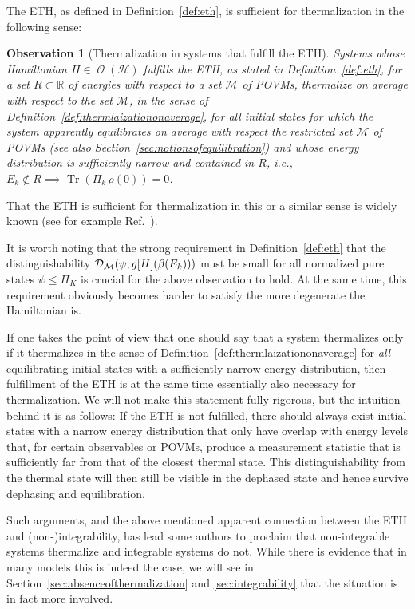 \documentclass[a4paper,12pt,listof=totoc,index=totoc,bibliography=totoc,headsepline=false,headings=normal,BCOR16.153846mm,DIV12,headinclude,twoside,cleardoublepage=empty,numbers=noenddot,final]{scrreprt}
\theoremstyle{mystyle}
\numberwithin{equation}{section}
\numberwithin{figure}{section}
\numberwithin{lemma}{section}
\numberwithin{theorem}{section}
\numberwithin{corollary}{section}
\numberwithin{definition}{section}
\numberwithin{conjecture}{section}
\newtheorem{observation}{Observation}
\numberwithin{observation}{section}
\newcommand{\+}{\mkern2mu}
\renewcommand{\H}{H}
\newcommand{\rhog}{g}
\newcommand{\tracedistance}[3][]{
  \ifthenelse{\equal{#2}{}}
  {\ifthenelse{\equal{#3}{}}
    {\mathcal{D}_{#1}}{}
  }{
    \ifthenelse{\equal{#1}{}}
    {\operatorname{\mathcal{D}}(#2,#3)}
    {\operatorname{\mathcal{D}}_{#1}(#2,#3)}
  }
}
\DeclareMathOperator{\1}{\mathds{1}}
\newcommand{\POVMs}{\mathcal{M}}
\DeclareMathOperator{\Obs}{\mathcal{O}}
\DeclareMathOperator{\Tr}{Tr}
\newcommand{\mc}[1]{\mathcal{#1}}
\newcommand{\mcH}{\mc{H}}
\newcommand{\mb}[1]{\mathbb{#1}}
\newcommand{\R}{\mb{R}}
\begin{document}
The ETH, as defined in Definition~\ref{def:eth}, is sufficient for thermalization in the following sense:
\begin{observation}[Thermalization in systems that fulfill the ETH] \label{obs:ethissufficientforthermalization}
  Systems whose Hamiltonian $\H \in \Obs(\mcH)$ fulfills the ETH, as stated in Definition~\ref{def:eth}, for a set $R \subset \R$ of energies with respect to a set $\POVMs$ of POVMs, thermalize on average with respect to the set $\POVMs$, in the sense of Definition~\ref{def:thermlaizationonaverage}, for all initial states for which the system apparently equilibrates on average with respect the restricted set $\POVMs$ of POVMs (see also Section~\ref{sec:notionsofequilibration}) and whose energy distribution is sufficiently narrow and contained in $R$, i.e., $E_k \notin R \implies \Tr(\Pi_k\,\rho(0)) = 0$.
\end{observation}
That the ETH is sufficient for thermalization in this or a similar sense is widely known (see for example Ref.~\cite{tasaki98}).

It is worth noting that the strong requirement in Definition~\ref{def:eth} that the distinguishability $\tracedistance[\POVMs]{\psi}{\rhog[\H](\beta(E_k))}$ must be small for all normalized pure states $\psi \leq \Pi_K$ is crucial for the above observation to hold.
At the same time, this requirement obviously becomes harder to satisfy the more degenerate the Hamiltonian is.

If one takes the point of view that one should say that a system thermalizes only if it thermalizes in the sense of Definition~\ref{def:thermlaizationonaverage} for \emph{all} equilibrating initial states with a sufficiently narrow energy distribution, then fulfillment of the ETH is at the same time essentially also necessary for thermalization.
We will not make this statement fully rigorous, but the intuition behind it is as follows:
If the ETH is not fulfilled, there should always exist initial states with a narrow energy distribution that only have overlap with energy levels that, for certain observables or POVMs, produce a measurement statistic that is sufficiently far from that of the closest thermal state.
This distinguishability from the thermal state will then still be visible in the dephased state and hence survive dephasing and equilibration.

Such arguments, and the above mentioned apparent connection between the ETH and \mbox{(non-)}integrability, has lead some authors to proclaim \cite{Kollath07,Cramer2008,Rigol08,Rigol09,Banuls10} that non-integrable systems thermalize and integrable systems do not.
While there is evidence that in many models this is indeed the case, we will see in Section~\ref{sec:absenceofthermalization} and \ref{sec:integrability} that the situation is in fact more involved.
\end{document}
